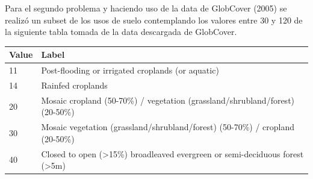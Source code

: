 \documentclass[11pt,]{article}
\begin{document}
Para el segundo problema y haciendo uso de la data de GlobCover (2005)
se realizó un subset de los usos de suelo contemplando los valores entre
30 y 120 de la siguiente tabla tomada de la data descargada de
GlobCover.

\begin{longtable}[]{@{}ll@{}}
\toprule
\begin{minipage}[b]{0.08\columnwidth}\raggedright\strut
Value\strut
\end{minipage} & \begin{minipage}[b]{0.86\columnwidth}\raggedright\strut
Label\strut
\end{minipage}\tabularnewline
\midrule
\endhead
\begin{minipage}[t]{0.08\columnwidth}\raggedright\strut
11\strut
\end{minipage} & \begin{minipage}[t]{0.86\columnwidth}\raggedright\strut
Post-flooding or irrigated croplands (or aquatic)\strut
\end{minipage}\tabularnewline
\begin{minipage}[t]{0.08\columnwidth}\raggedright\strut
14\strut
\end{minipage} & \begin{minipage}[t]{0.86\columnwidth}\raggedright\strut
Rainfed croplands\strut
\end{minipage}\tabularnewline
\begin{minipage}[t]{0.08\columnwidth}\raggedright\strut
20\strut
\end{minipage} & \begin{minipage}[t]{0.86\columnwidth}\raggedright\strut
Mosaic cropland (50-70\%) / vegetation (grassland/shrubland/forest)
(20-50\%)\strut
\end{minipage}\tabularnewline
\begin{minipage}[t]{0.08\columnwidth}\raggedright\strut
30\strut
\end{minipage} & \begin{minipage}[t]{0.86\columnwidth}\raggedright\strut
Mosaic vegetation (grassland/shrubland/forest) (50-70\%) / cropland
(20-50\%)\strut
\end{minipage}\tabularnewline
\begin{minipage}[t]{0.08\columnwidth}\raggedright\strut
40\strut
\end{minipage} & \begin{minipage}[t]{0.86\columnwidth}\raggedright\strut
Closed to open (\textgreater{}15\%) broadleaved evergreen or
semi-deciduous forest (\textgreater{}5m)\strut

\end{minipage}
\end{longtable}
\end{document}
